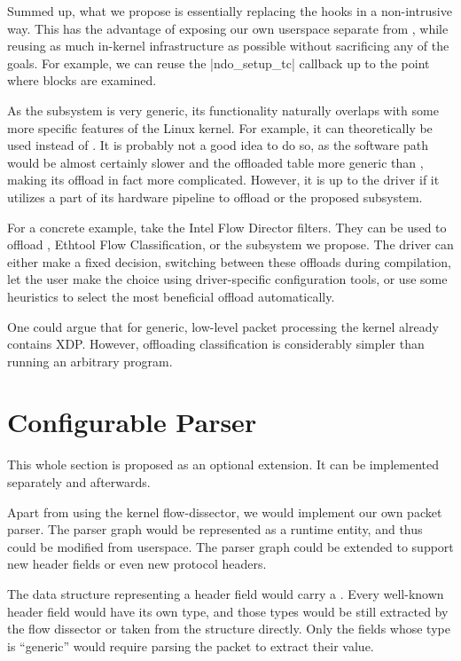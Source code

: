 Summed up, what we propose is essentially replacing the  hooks in
a non-intrusive way. This has the advantage of exposing our own userspace
 separate from , while reusing as much in-kernel infrastructure as
possible without sacrificing any of the goals. For example, we can reuse the
\fnc|ndo_setup_tc| callback up to the point where blocks are examined.

As the subsystem is very generic, its functionality naturally overlaps with
some more specific features of the Linux kernel. For example, it can
theoretically be used instead of . It is probably not a good idea to do
so, as the software path would be almost certainly slower and the offloaded
table more generic than , making its offload in fact more complicated.
However, it is up to the driver if it utilizes a part of its hardware pipeline
to offload  or the proposed subsystem.

For a concrete example, take the Intel Flow Director filters. They can be used
to offload , Ethtool Flow Classification, or the subsystem we propose.
The driver can either make a fixed decision, switching between these offloads
during compilation, let the user make the choice using driver-specific configuration
tools, or use some heuristics to select the most beneficial offload
automatically.

One could argue that for generic, low-level packet processing the kernel
already contains \acrfull{XDP}. However, offloading classification is
considerably simpler than running an arbitrary  program.

\section{Configurable Parser}
\label{rfc:parser}

This whole section is proposed as an optional extension. It can be implemented
separately and afterwards.

Apart from using the kernel flow-dissector, we would implement our own packet
parser. The parser graph would be represented as a runtime entity, and thus
could be modified from userspace. The parser graph could be extended to support
new header fields or even new protocol headers.

The data structure representing a header field would carry a .
Every well-known header field would have its own type, and those types would be
still extracted by the flow dissector or taken from the \skb{} structure directly.
Only the fields whose type is ``generic'' would require parsing the packet
to extract their value.

